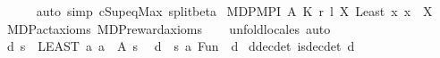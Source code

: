 \begin{isabellebody}
\ \ \ \ \isamarkupfalse%
\ {\isacharparenleft}{\kern0pt}auto\ simp{\isacharcolon}{\kern0pt}\ cSup{\isacharunderscore}{\kern0pt}eq{\isacharunderscore}{\kern0pt}Max\ split{\isacharunderscore}{\kern0pt}beta{\isacharprime}{\kern0pt}{\isacharparenright}{\kern0pt}\isanewline
{}\isamarkupfalse%
%
\endisatagproof
{\isafoldproof}%
%
\isadelimproof
%
\endisadelimproof
%
\isadelimdocument
%
\endisadelimdocument
%
\isatagdocument
%
\isamarkuptrue%
%
\endisatagdocument
{\isafolddocument}%
%
\isadelimdocument
%
\endisadelimdocument
{}\isamarkupfalse%
\ MDP{\isacharunderscore}{\kern0pt}MPI\ A\ K\ r\ l\ {\isachardoublequoteopen}{\isasymlambda}X{\isachardot}{\kern0pt}\ Least\ {\isacharparenleft}{\kern0pt}{\isasymlambda}x{\isachardot}{\kern0pt}\ x\ {\isasymin}\ X{\isacharparenright}{\kern0pt}{\isachardoublequoteclose}\isanewline
%
\isadelimproof
\ \ %
\endisadelimproof
%
\isatagproof
{}\isamarkupfalse%
\ MDP{\isacharunderscore}{\kern0pt}act{\isacharunderscore}{\kern0pt}axioms\ MDP{\isacharunderscore}{\kern0pt}reward{\isacharunderscore}{\kern0pt}axioms\isanewline
\ \ \isamarkupfalse%
\ unfold{\isacharunderscore}{\kern0pt}locales\ auto%
\endisatagproof
{\isafoldproof}%
%
\isadelimproof
\isanewline
%
\endisadelimproof
\isanewline
\isanewline
{}\isamarkupfalse%
\ {\isachardoublequoteopen}d{}\ s\ {\isacharequal}{\kern0pt}\ {\isacharparenleft}{\kern0pt}LEAST\ a{\isachardot}{\kern0pt}\ a\ {\isasymin}\ A\ s{\isacharparenright}{\kern0pt}{\isachardoublequoteclose}\ \isanewline
{}\isamarkupfalse%
\ d{}{\isacharprime}{\kern0pt}\ {\isacharcolon}{\kern0pt}{\isacharcolon}{\kern0pt}\ {\isachardoublequoteopen}{\isacharparenleft}{\kern0pt}{\isacharprime}{\kern0pt}s{\isacharcomma}{\kern0pt}\ {\isacharprime}{\kern0pt}a{\isacharparenright}{\kern0pt}\ Fun{\isachardoublequoteclose}\ \ d{}%
\isadelimproof
%
\endisadelimproof
%
\isatagproof
\isacommand{{\isachardot}{\kern0pt}}\isamarkupfalse%
%
\endisatagproof
{\isafoldproof}%
%
\isadelimproof
%
\endisadelimproof
\isanewline
\isanewline
{}\isamarkupfalse%
\ d{}{\isacharunderscore}{\kern0pt}dec{\isacharunderscore}{\kern0pt}det{\isacharcolon}{\kern0pt}\ {\isachardoublequoteopen}is{\isacharunderscore}{\kern0pt}dec{\isacharunderscore}{\kern0pt}det\ d{}{\isachardoublequoteclose}\isanewline
%
\isadelimproof
\ \ %
\endisadelimproof
%
\isatagproof
{}\isamarkupfalse%

\end{isabellebody}
